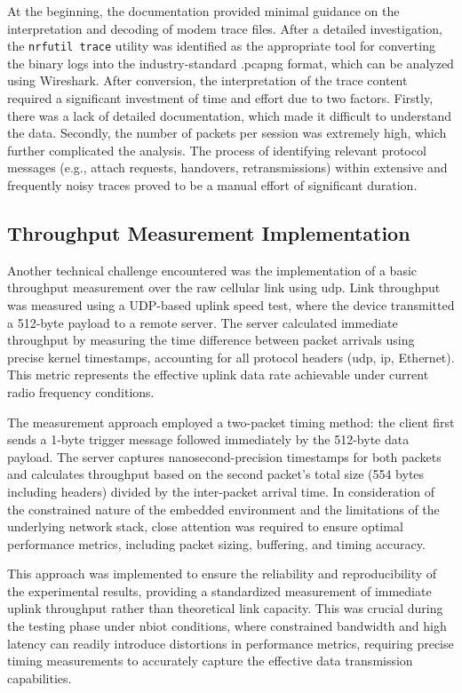 \documentclass[12pt, english, openany]{book}
\begin{document}
At the beginning, the documentation provided minimal guidance on the interpretation and decoding of modem trace files. After a detailed investigation, the \texttt{nrfutil trace} utility was identified as the appropriate tool for converting the binary logs into the industry-standard .pcapng format, which can be analyzed using Wireshark. After conversion, the interpretation of the trace content required a significant investment of time and effort due to two factors. Firstly, there was a lack of detailed documentation, which made it difficult to understand the data. Secondly, the number of packets per session was extremely high, which further complicated the analysis. The process of identifying relevant protocol messages (e.g., attach requests, handovers, retransmissions) within extensive and frequently noisy traces proved to be a manual effort of significant duration.
\subsection{Throughput Measurement Implementation}

Another technical challenge encountered was the implementation of a basic throughput measurement over the raw cellular link using \gls{udp}. Link throughput was measured using a UDP-based uplink speed test, where the device transmitted a 512-byte payload to a remote server. The server calculated immediate throughput by measuring the time difference between packet arrivals using precise kernel timestamps, accounting for all protocol headers (\gls{udp}, \gls{ip}, Ethernet). This metric represents the effective uplink data rate achievable under current radio frequency conditions.

The measurement approach employed a two-packet timing method: the client first sends a 1-byte trigger message followed immediately by the 512-byte data payload. The server captures nanosecond-precision timestamps for both packets and calculates throughput based on the second packet's total size (554 bytes including headers) divided by the inter-packet arrival time. In consideration of the constrained nature of the embedded environment and the limitations of the underlying network stack, close attention was required to ensure optimal performance metrics, including packet sizing, buffering, and timing accuracy.

This approach was implemented to ensure the reliability and reproducibility of the experimental results, providing a standardized measurement of immediate uplink throughput rather than theoretical link capacity. This was crucial during the testing phase under \gls{nbiot} conditions, where constrained bandwidth and high latency can readily introduce distortions in performance metrics, requiring precise timing measurements to accurately capture the effective data transmission capabilities.
\end{document}
